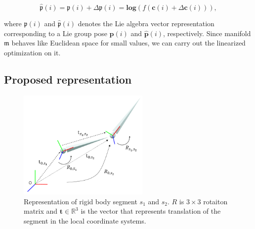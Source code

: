 \begin{equation}
	\hat{\mathfrak{p}}(i) = \mathfrak{p}(i)+\Delta \mathfrak{p}(i) = \mathbf{log}\left(f(\mathbf{c}(i)+\Delta{}\mathbf{c}(i))\right),
\end{equation} 

where $\mathfrak{p}(i)$ and $\hat{\mathfrak{p}}(i)$ denotes the Lie algebra vector representation corresponding to a Lie group pose $\mathbf{p}(i)$ and $\hat{\mathbf{p}}(i) $, respectively.
Since manifold $\mathfrak{m}$ behaves like Euclidean space for small values, we can carry out the linearized optimization on it.

\subsection{Proposed representation}

\begin{figure}[ht]
  \centering
  \includegraphics[width=2.5in]{images/rigidBody}
  \caption{Representation of rigid body segment $s_1$ and $s_2$. $R$ is $3\times 3$ rotaiton matrix and $\mathbf{t}\in \mathbb{R}^{3}$ is the vector that represents translation of the segment in the local coordinate systems.}
  \label{fig:rigidbody_example}
\end{figure}


